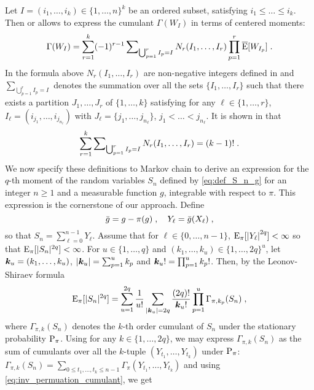 Let $I =(i_1,\dots,i_k) \in \{1,\ldots,n\}^k$ be an ordered subset, satisfying $i_1 \leq \dots \leq i_{k}$. Then \cite[Lemma~3]{Statul1970} or \cite[Lemma~1.1]{saulis:statulevicius:1991} allows to express the cumulant $\Gamma(W_I)$  in terms of centered moments:
\begin{equation}
\label{eq:cumulantsviamoments}
\Gamma(W_I) = \sum_{r=1}^k (-1)^{r-1} \sum\nolimits_{\bigcup_{p=1}^r I_p = I} N_r(I_1, \ldots, I_r) \prod_{p=1}^r \overline{\mathrm{E}}[W_{I_p} ]\;.
\end{equation}
In the formula above $N_r(I_1,\dots,I_r)$ are non-negative integers defined in \cite[Appendix~2]{saulis:statulevicius:1991} and $\sum_{\bigcup_{p=1}^r I_p = I}$ denotes the summation over all the sets $ \{I_1,\ldots,I_r\}$  such that there exists a partition $J_1,\ldots,J_r$ of $\{1,\ldots,k\}$ satisfying for any $\ell \in \{1,\ldots,r\}$, $I_\ell = (i_{j_1},\ldots,i_{j_{n_\ell}})$ with $J_{\ell} = \{j_1,\ldots,j_{n_{\ell}} \}$, $j_1 < \ldots < j_{n_{\ell}}$. It is shown in  \cite[Eq. 4.43]{saulis:statulevicius:1991}
that
\begin{equation}
\label{eq:formula-summation}
\sum_{r=1}^k \sum\nolimits_{\bigcup_{p=1}^r I_p = I} N_r(I_1, \ldots, I_r)  = (k-1)! \;.
\end{equation}
We now specify these definitions to Markov chain to derive  an expression for the $q$-th moment of the random variables $S_n$ defined by \eqref{eq:def_S_n_g} for an integer $n \geq 1$ and a measurable function $g$, integrable with respect to $\pi$. This expression is the cornerstone of our approach. Define
\begin{equation}
\label{eq:def_Y_ell}
\bar{g} = g - \pi(g) \;, \quad   Y_{\ell} = \bar{g}(X_\ell) \;,
\end{equation}
so that $S_n = \sum_{\ell =0}^{n-1} Y_{\ell}$.
Assume that for $\ell \in \{0, \ldots, n-1\}$, $\mathrm{E}_{\pi}[\left\vert Y_{\ell} \right\vert^{2q}] < \infty$  so that $\mathrm{E}_{\pi}[|S_n|^{2q}] < \infty$. For $u \in \{1,\ldots,q\}$ and $(k_1, \ldots , k_u) \in \{1, \ldots, 2q \}^u$, let ${\boldsymbol k}_u = (k_1, \ldots, k_u)$, $|{\boldsymbol k}_u| = \sum_{p=1}^u k_p$ and ${\boldsymbol k}_u! = \prod_{p=1}^u k_p!$. Then, by the Leonov-Shiraev formula \cite[Eq.~1.53]{saulis:statulevicius:1991}
\begin{equation}
\label{eq:leonov-shiraev}
    \mathrm{E}_\pi[|S_n|^{2q}] = \sum_{u=1}^{2q} \frac{1}{u!} \sum_{|{\boldsymbol k}_u| = 2q} \frac{(2q)!}{{\boldsymbol k_u}!} \prod_{p=1}^u \Gamma_{\pi, k_p}(S_n) \;,
\end{equation}
where $\Gamma_{\pi, k}(S_n)$ denotes the $k$-th order cumulant of $S_n$ under the stationary probability $\mathrm{P}_\pi$. Using \cite[Eq.~1.47]{saulis:statulevicius:1991} for any $k \in \{1,\ldots,2q\}$, we may express $\Gamma_{\pi,k}(S_n)$ as the sum of cumulants over all the $k$-tuple $(Y_{t_1},\dots,Y_{t_k})$ under $\mathrm{P}_\pi$: $\Gamma_{\pi,k}(S_n)=  \sum_{0 \le t_1, \ldots, t_k \le n-1} \Gamma_{\pi}(Y_{t_1}, \ldots, Y_{t_k})$ and using \eqref{eq:inv_permuation_cumulant}, we get
